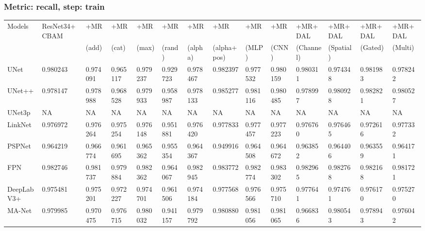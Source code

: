 \documentclass{article}
\begin{document}
\subsubsection{Metric: recall, step: train}
\begin{tabular}{llllllllllllll}
\toprule
Models & ResNet34+CBAM & +MR  & +MR  & +MR  & +MR  & +MR  & +MR  & +MR  & +MR  & +MR+DAL & +MR+DAL & +MR+DAL & +MR+DAL \\
       &             &  (add) &  (cat) &  (max) &  (rand) &  (alpha) &  (alpha+pos) &  (MLP) &  (CNN) & (Channel) & (Spatial) & (Gated) & (Multi) \\
\midrule
UNet & 0.980243 & 0.974091 & 0.965117 & 0.979237 & 0.929723 & 0.978467 & 0.982397 & 0.977532 & 0.980159 & 0.980311 & 0.974348 & 0.981983 & 0.978242 \\
UNet++ & 0.978147 & 0.978988 & 0.968528 & 0.979933 & 0.958987 & 0.978133 & 0.985277 & 0.981116 & 0.980485 & 0.978997 & 0.980928 & 0.982821 & 0.980527 \\
UNet3p & NA & NA & NA & NA & NA & NA & NA & NA & NA & NA & NA & NA & NA \\
LinkNet & 0.976972 & 0.976264 & 0.975254 & 0.976148 & 0.951881 & 0.976420 & 0.977833 & 0.977457 & 0.977223 & 0.976760 & 0.976465 & 0.972616 & 0.977332 \\
PSPNet & 0.964219 & 0.966774 & 0.961695 & 0.965362 & 0.955354 & 0.964367 & 0.949916 & 0.964508 & 0.964672 & 0.963852 & 0.964406 & 0.963559 & 0.964171 \\
FPN & 0.982746 & 0.981737 & 0.979884 & 0.982362 & 0.964067 & 0.982945 & 0.983772 & 0.982774 & 0.983302 & 0.982965 & 0.982768 & 0.982168 & 0.981721 \\
DeepLabV3+ & 0.975481 & 0.975201 & 0.972227 & 0.974701 & 0.961506 & 0.974184 & 0.977568 & 0.976566 & 0.975710 & 0.977641 & 0.974761 & 0.976170 & 0.975270 \\
MA-Net & 0.979985 & 0.970475 & 0.976715 & 0.980032 & 0.941157 & 0.979792 & 0.980880 & 0.981056 & 0.981065 & 0.966836 & 0.980543 & 0.978943 & 0.976042 \\
\bottomrule
\end{tabular}
\end{document}
